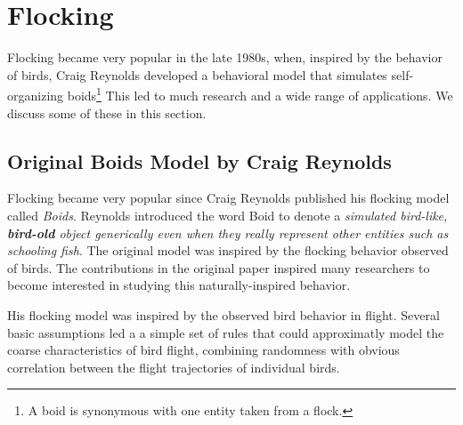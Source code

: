 





\section{Flocking}
Flocking became very popular in the late 1980s, when, inspired by the behavior of birds, Craig Reynolds developed a behavioral model that simulates self-organizing boids\footnote{A boid is synonymous with one entity taken from a flock.} This led to much research and a wide range of applications. We discuss some of these in this section.  

\subsection{Original Boids Model by Craig Reynolds}
Flocking became very popular since Craig Reynolds published his flocking model called \textit{Boids}\cite{craig1}. Reynolds introduced the word Boid to denote a \textit{simulated bird-like, \textbf{bird-old} object generically even when they really represent other entities such as schooling fish}. The original model was inspired by the flocking behavior observed of birds. The contributions in the original paper inspired many researchers to become interested in studying this naturally-inspired behavior.

His flocking model was inspired by the observed bird behavior in flight. Several basic assumptions led a a simple set of rules that could approximatly model the coarse characteristics of bird flight, combining randomness with obvious correlation between the flight trajectories of individual birds.  

